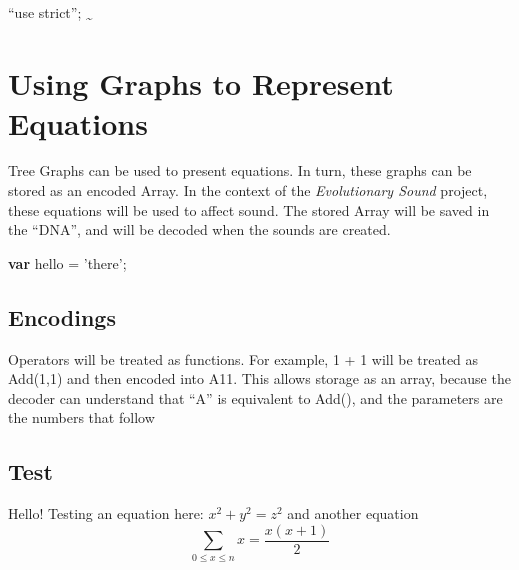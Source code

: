 \documentclass[]{article}
\date{}
\newenvironment{Shaded}{}{}
\newcommand{\KeywordTok}[1]{\textbf{#1}}
\newcommand{\StringTok}[1]{#1}
\newcommand{\OperatorTok}[1]{#1}
\newcommand{\NormalTok}[1]{#1}
\begin{document}
``use strict''; \textsubscript{\textasciitilde{}}

\section{Using Graphs to Represent
Equations}\label{using-graphs-to-represent-equations}

Tree Graphs can be used to present equations. In turn, these graphs can
be stored as an encoded Array. In the context of the \emph{Evolutionary
Sound} project, these equations will be used to affect sound. The stored
Array will be saved in the ``DNA'', and will be decoded when the sounds
are created.

\begin{Shaded}
\begin{Highlighting}[]
\KeywordTok{var}\NormalTok{ hello }\OperatorTok{=} \StringTok{'there'}\OperatorTok{;}
\end{Highlighting}
\end{Shaded}

\subsection{Encodings}\label{encodings}

Operators will be treated as functions. For example, 1 + 1 will be
treated as Add(1,1) and then encoded into A11. This allows storage as an
array, because the decoder can understand that ``A'' is equivalent to
Add(), and the parameters are the numbers that follow

\subsection{Test}\label{test}

Hello! Testing an equation here: \(x^2 + y^2 = z^2\) and another
equation \[\sum_{0 \leq x \leq n} {x} = \frac{x(x+1)}{2}\]
\end{document}
